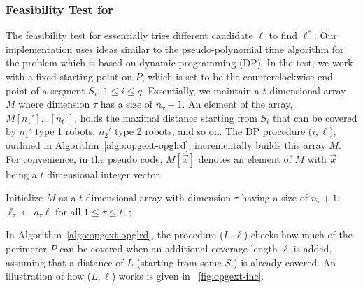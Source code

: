 \subsubsection{Feasibility Test for \opglrd} The feasibility test for \opglrd 
essentially tries different candidate $\ell$ to find $\ell^*$. Our implementation uses 
ideas similar to the pseudo-polynomial time algorithm for the \knapsack problem which
is based on dynamic programming (DP). In the test, we work with a fixed starting point on 
$P$, which is set to be the counterclockwise end point of a segment $S_i$, $1 \le i \le q$. 
Essentially, we maintain a $t$ dimensional array $M$ where dimension $\tau$
has a size of $n_{\tau} +1$. An element of the array, $M[n_1']\ldots[n_t']$, holds the 
maximal distance starting from $S_i$ that can be covered by $n_1'$ type 1 robots, 
$n_2'$ type 2 robots, and so on. The DP procedure \opglrfeasible($i, \ell$), outlined in 
Algorithm~\ref{algo:opgext-opglrd}, incrementally builds this array $M$. For convenience,
in the pseudo code, $M[\vec{x}]$ denotes an element of $M$ with $\vec{x}$ being 
a $t$ dimensional integer vector. 

\begin{algorithm}\label{algo:opgext-opglrd}
	\DontPrintSemicolon
		Initialize $M$ as a $t$ dimensional array with dimension $\tau$ having a size of $n_{\tau} + 1$;\;
		$\ell_{\tau} \leftarrow a_{\tau}\ell$ for all $1\le \tau \le t$;\;
		;
	\caption{\opglrfeasible($i, \ell$)}
\end{algorithm}

In Algorithm~\ref{algo:opgext-opglrd}, the procedure \inc($L, \ell$) checks how much of the 
perimeter $P$ can be covered when an additional coverage length $\ell$ is added, 
assuming that a distance of $L$ (starting from some $S_i$) is already covered. An 
illustration of how \inc($L, \ell$) works is given in ~\ref{fig:opgext-inc}.
 

